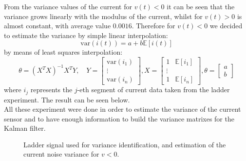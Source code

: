 From the variance values of the current for $v(t)<0$ it can be seen that the variance grows linearly with the modulus of the current, whilst for $v(t)>0$ is almost constant, with average value $0.0016$. Therefore for $v(t)<0$ we decided to estimate the variance by simple linear interpolation:
\begin{equation}
\text{var}(i(t)) = a + b \mathbb{E}[i(t)]
\end{equation}
by means of least squares interpolation:
\begin{equation}
\theta = (X^T X)^{-1} X^T Y, \quad
Y  = \begin{bmatrix} \text{var}(i_1)\\ \vdots \\ \text{var}(i_n) \end{bmatrix},
X = \begin{bmatrix} 1 & \mathbb{E}[i_1]\\ \vdots \\ 1 & \mathbb{E}[i_n] \end{bmatrix},
\theta = \begin{bmatrix} a\\ b\end{bmatrix}
\end{equation}
where $i_j$ represents the $j$-eth segment of current data taken from the ladder experiment. The result can be seen below.\\

All these experiment were done in order to estimate the variance of the current sensor and to have enough information to build the variance matrixes for the Kalman filter.
  \begin{figure}[!h]
  	\centering
  	\caption{Ladder signal used for variance identification, and estimation of the current noise variance for $v<0$.}
 
  \end{figure}

